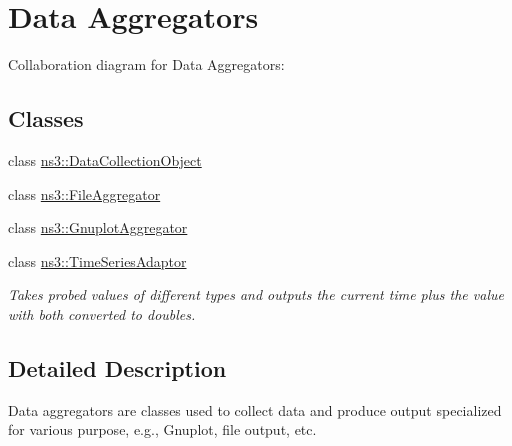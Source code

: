 \hypertarget{group__aggregator}{}\section{Data Aggregators}
\label{group__aggregator}
Collaboration diagram for Data Aggregators\+:
\subsection*{Classes}
\begin{DoxyCompactItemize}
\item 
class \hyperlink{classns3_1_1DataCollectionObject}{ns3\+::\+Data\+Collection\+Object}
\item 
class \hyperlink{classns3_1_1FileAggregator}{ns3\+::\+File\+Aggregator}
\item 
class \hyperlink{classns3_1_1GnuplotAggregator}{ns3\+::\+Gnuplot\+Aggregator}
\item 
class \hyperlink{classns3_1_1TimeSeriesAdaptor}{ns3\+::\+Time\+Series\+Adaptor}
\begin{DoxyCompactList}\small\item\em Takes probed values of different types and outputs the current time plus the value with both converted to doubles. \end{DoxyCompactList}\end{DoxyCompactItemize}


\subsection{Detailed Description}
Data aggregators are classes used to collect data and produce output specialized for various purpose, e.\+g., Gnuplot, file output, etc. 